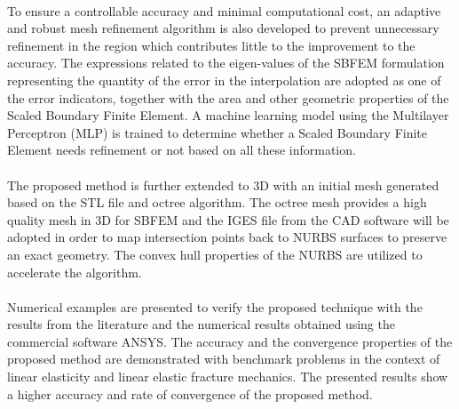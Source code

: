\paragraph{}
To ensure a controllable accuracy and minimal computational cost, an adaptive and robust mesh refinement algorithm is also developed to prevent unnecessary refinement in the region which contributes little to the improvement to the accuracy.
The expressions related to the eigen-values of the SBFEM formulation representing the quantity of the error in the interpolation are adopted as one of the error indicators, together with the area and other geometric properties of the Scaled Boundary Finite Element.
A machine learning model using the Multilayer Perceptron (MLP) is trained to determine whether a Scaled Boundary Finite Element needs refinement or not based on all these information.

\paragraph{}
The proposed method is further extended to 3D with an initial mesh generated based on the STL file and octree algorithm.
The octree mesh provides a high quality mesh in 3D for SBFEM and the IGES file from the CAD software will be adopted in order to map intersection points back to NURBS surfaces to preserve an exact geometry.
The convex hull properties of the NURBS are utilized to accelerate the algorithm.

\paragraph{}
Numerical examples are presented to verify the proposed technique with the results from the literature and the numerical results obtained using the commercial software ANSYS.
The accuracy and the convergence properties of the proposed method are demonstrated with benchmark problems in the context of linear elasticity and linear elastic fracture mechanics.
The presented results show a higher accuracy and rate of convergence of the proposed method.



